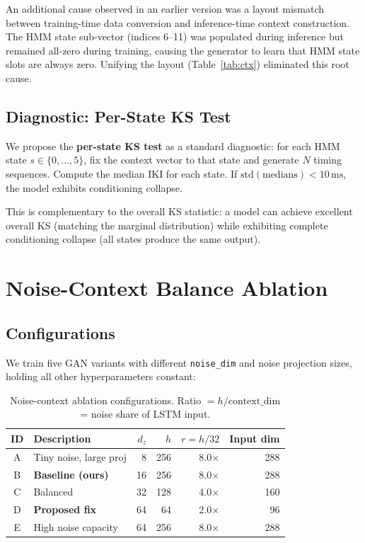 \documentclass[sigconf,nonacm]{acmart}
\begin{document}
An additional cause observed in an earlier version was a layout mismatch
between training-time data conversion and inference-time context construction.
The HMM state sub-vector (indices 6--11) was populated during inference
but remained all-zero during training, causing the generator to learn
that HMM state slots are always zero.
Unifying the layout (Table~\ref{tab:ctx}) eliminated this root cause.

\subsection{Diagnostic: Per-State KS Test}

We propose the \textbf{per-state KS test} as a standard diagnostic:
for each HMM state $s \in \{0,\ldots,5\}$, fix the context vector to
that state and generate $N$ timing sequences.
Compute the median IKI for each state.
If $\mathrm{std}(\text{medians}) < 10\,\text{ms}$, the model exhibits
conditioning collapse.

This is complementary to the overall KS statistic: a model can achieve
excellent overall KS (matching the marginal distribution) while exhibiting
complete conditioning collapse (all states produce the same output).


\section{Noise-Context Balance Ablation}

\subsection{Configurations}

We train five GAN variants with different \texttt{noise\_dim} and noise
projection sizes, holding all other hyperparameters constant:

\begin{table}[t]
\centering
\caption{Noise-context ablation configurations.
  Ratio $= h / \text{context\_dim}$ = noise share of LSTM input.}
\begin{tabular}{clrrrr}
\toprule
ID & Description & $d_z$ & $h$ & $r = h/32$ & Input dim \\
\midrule
A & Tiny noise, large proj    &  8 & 256 & 8.0× & 288 \\
B & \textbf{Baseline (ours)}  & 16 & 256 & 8.0× & 288 \\
C & Balanced                  & 32 & 128 & 4.0× & 160 \\
D & \textbf{Proposed fix}     & 64 &  64 & 2.0× &  96 \\
E & High noise capacity       & 64 & 256 & 8.0× & 288 \\
\bottomrule
\end{tabular}
\label{tab:noise_ablation}
\end{table}
\end{document}
